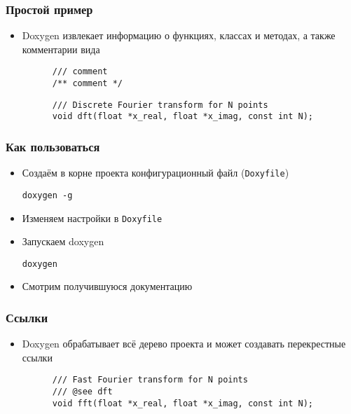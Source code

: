 \documentclass[onlymath]{beamer}
\begin{document}
\begin{frame}[fragile]
  \frametitle{Простой пример}
  \begin{itemize}
  \item Doxygen извлекает информацию о функциях, классах и методах, а
    также комментарии вида
    \begin{lstlisting}
      /// comment
      /** comment */
    \end{lstlisting}
    \begin{lstlisting}
      /// Discrete Fourier transform for N points
      void dft(float *x_real, float *x_imag, const int N);
    \end{lstlisting}
  \end{itemize}
\end{frame}

\begin{frame}[fragile]
  \frametitle{Как пользоваться}
  \begin{itemize}
  \item Создаём в корне проекта конфигурационный файл (\texttt{Doxyfile})
\begin{lstlisting}
doxygen -g
\end{lstlisting}
  \item Изменяем настройки в \texttt{Doxyfile}
  \item Запускаем doxygen
\begin{lstlisting}
doxygen
\end{lstlisting}
  \item Смотрим получившуюся документацию
  \end{itemize}
\end{frame}

\begin{frame}[fragile]
  \frametitle{Ссылки}
  \begin{itemize}
  \item Doxygen обрабатывает всё дерево проекта и может создавать
    перекрестные ссылки
    \begin{lstlisting}
      /// Fast Fourier transform for N points
      /// @see dft
      void fft(float *x_real, float *x_imag, const int N);
    \end{lstlisting}
  \end{itemize}
\end{frame}
\end{document}

